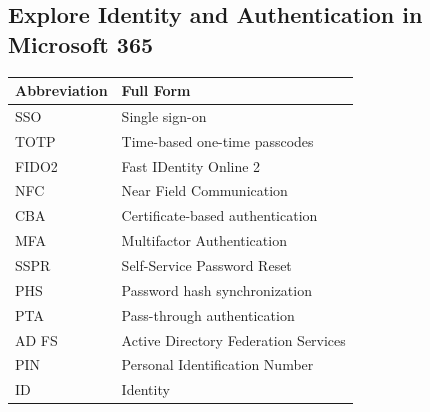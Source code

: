 \documentclass[10pt]{article}
\begin{document}
\subsection{Explore Identity and Authentication in Microsoft 365}

\begin{center}
\begin{tabular}{>{\raggedright\arraybackslash}p{} >{\raggedright\arraybackslash}p{}}
\toprule
\textbf{Abbreviation} & \textbf{Full Form} \\
\midrule
SSO & Single sign-on \\
TOTP & Time-based one-time passcodes \\
FIDO2 & Fast IDentity Online 2 \\
NFC & Near Field Communication \\
CBA & Certificate-based authentication \\
MFA & Multifactor Authentication \\
SSPR & Self-Service Password Reset \\
PHS & Password hash synchronization \\
PTA & Pass-through authentication \\
AD FS & Active Directory Federation Services \\
PIN & Personal Identification Number \\
ID & Identity \\
\bottomrule
\end{tabular}
\end{center}
\end{document}

